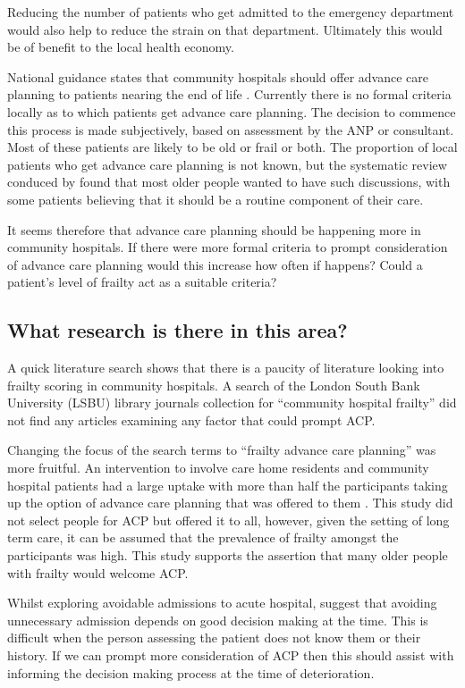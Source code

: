 \documentclass
[
	12pt,
	a4paper,
	oneside,
]{report}
\begin{document}
Reducing the number of patients who get admitted to the emergency department would
also help to reduce the strain on that department. Ultimately this would be of
benefit to the local health economy.

National guidance states that community hospitals should offer advance care
planning to patients nearing the end of life \parencite{dh:09}.
Currently there is no formal criteria locally as to which patients get advance 
care planning.
The decision to commence this process is made subjectively, based on assessment 
by the ANP or consultant. Most of these patients are likely to be old or frail
or both. The proportion of local patients who get advance care planning is not known,
but the systematic review conduced by \textcite{sharp:13} found that most older
people wanted to have such discussions, with some patients believing that it 
should be a routine component of their care.

It seems therefore that advance care planning should be happening more in community
hospitals. If there were more formal criteria to prompt consideration
of advance care planning would this increase how often if happens? Could 
a patient's level of frailty act as a suitable criteria?

\subsection{What research is there in this area?}

A quick literature search shows that there is a paucity of literature looking 
into frailty scoring in community hospitals.
A search of the London South Bank University (LSBU) library journals 
collection for ``community hospital frailty''
did not find any articles examining any factor that could prompt ACP.

Changing the focus of the search terms to ``frailty advance care planning''
was more fruitful.
An intervention to involve care home residents and community hospital patients
had a large uptake with more than half the participants taking up the option of
advance care planning that was offered to them \parencite{mcglade:17}. This 
study did not select people for ACP but offered it to all, however, given the 
setting of long term care, it can be assumed that the prevalence of frailty
amongst the participants was high. This study supports the assertion that many
older people with frailty would welcome ACP.

Whilst exploring avoidable admissions to acute hospital, \textcite{mytton:12} 
suggest that avoiding unnecessary admission depends on good decision making at 
the time. This is difficult when the person assessing the patient does not know
them or their history. If we can prompt more consideration of ACP then this 
should assist with informing the decision making process at the time of 
deterioration.
\end{document}
